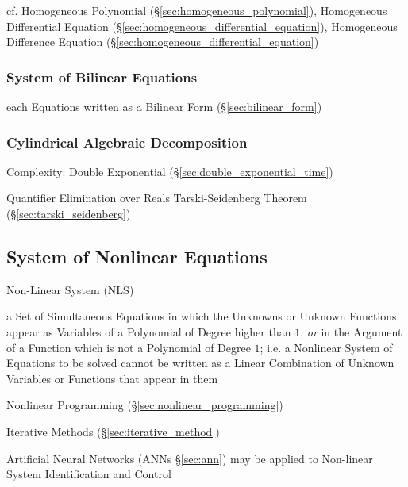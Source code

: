 cf. Homogeneous Polynomial (\S\ref{sec:homogeneous_polynomial}), Homogeneous
Differential Equation (\S\ref{sec:homogeneous_differential_equation}),
Homogeneous Difference Equation (\S\ref{sec:homogeneous_differential_equation})



\subsubsection{System of Bilinear Equations}\label{sec:bilinear_equation_system}

each Equations written as a Bilinear Form (\S\ref{sec:bilinear_form})



\subsubsection{Cylindrical Algebraic Decomposition}
\label{sec:cylindrical_algebraic_decomposition}

Complexity: Double Exponential (\S\ref{sec:double_exponential_time})

Quantifier Elimination over Reals \fist Tarski-Seidenberg Theorem
(\S\ref{sec:tarski_seidenberg})



\subsection{System of Nonlinear Equations}\label{sec:nonlinear_equation_system}

Non-Linear System (NLS)

a Set of Simultaneous Equations in which the Unknowns or Unknown Functions
appear as Variables of a Polynomial of Degree higher than $1$, \emph{or} in the
Argument of a Function which is not a Polynomial of Degree $1$; i.e. a
Nonlinear System of Equations to be solved cannot be written as a Linear
Combination of Unknown Variables or Functions that appear in them

\fist Nonlinear Programming (\S\ref{sec:nonlinear_programming})

\fist Iterative Methods (\S\ref{sec:iterative_method})

\fist Artificial Neural Networks (ANNs \S\ref{sec:ann}) may be applied to
Non-linear System Identification and Control



